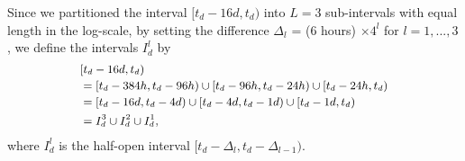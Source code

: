 \documentclass[twoside]{article}
\begin{document}
    Since we partitioned the interval $[t_d-16d, t_d)$ into $L=3$ sub-intervals with equal length in the log-scale, by setting the difference $\Delta_l$ = (6 hours) $\times  4^l$ for $l=1,...,3$, we define the intervals $I_d^l$ by 
    \begin{equation*}
    \footnotesize
    \begin{aligned}
    &[t_d-16d,t_d) \\&=[t_d-384h, t_d-96h) \cup [t_d-96h, t_d-24h)\cup [t_d-24h, t_d) \\&= [t_d-16d, t_d-4d) \cup [t_d-4d, t_d-1d)\cup [t_d-1d, t_d)
    \\&=I_d^{3}\cup  I_d^{2}\cup I_d^{1},
    \end{aligned}
    \end{equation*}
    where $I_{d}^{l} $ is the half-open interval $[t_d-\Delta_l, t_d-\Delta_{l-1})$. 
    
\end{document}
